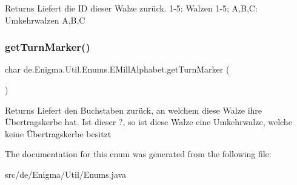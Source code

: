 \begin{DoxyReturn}{Returns}
Liefert die \textquotesingle{}ID\textquotesingle{} dieser Walze zurück. 1-\/5\+: Walzen 1-\/5; A,B,C\+: Umkehrwalzen A,B,C 
\end{DoxyReturn}
\mbox{\label{enumde_1_1_enigma_1_1_util_1_1_enums_1_1_e_mill_alphabet_a0e912c02d1cc35b4ff6637674bcc7c58}} 
\subsubsection{\texorpdfstring{get\+Turn\+Marker()}{getTurnMarker()}}
{\footnotesize\ttfamily char de.\+Enigma.\+Util.\+Enums.\+E\+Mill\+Alphabet.\+get\+Turn\+Marker (\begin{DoxyParamCaption}{ }\end{DoxyParamCaption})}

\begin{DoxyReturn}{Returns}
Liefert den Buchstaben zurück, an welchem diese Walze ihre Übertragskerbe hat. Ist dieser \textquotesingle{}?\textquotesingle{}, so ist diese Walze eine Umkehrwalze, welche keine Übertragskerbe besitzt 
\end{DoxyReturn}


The documentation for this enum was generated from the following file\+:\begin{DoxyCompactItemize}
\item 
src/de/\+Enigma/\+Util/Enums.\+java\end{DoxyCompactItemize}
